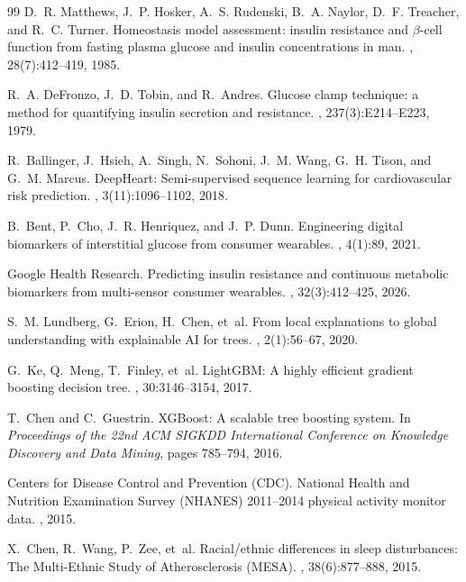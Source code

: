 \documentclass[12pt,a4paper,oneside]{report}
\begin{document}
\begin{thebibliography}{99}
D.~R. Matthews, J.~P. Hosker, A.~S. Rudenski, B.~A. Naylor, D.~F. Treacher, and R.~C. Turner.
\newblock Homeostasis model assessment: insulin resistance and $\beta$-cell function from fasting plasma glucose and insulin concentrations in man.
, 28(7):412--419, 1985.

R.~A. DeFronzo, J.~D. Tobin, and R.~Andres.
\newblock Glucose clamp technique: a method for quantifying insulin secretion and resistance.
, 237(3):E214--E223, 1979.

R.~Ballinger, J.~Hsieh, A.~Singh, N.~Sohoni, J.~M. Wang, G.~H. Tison, and G.~M. Marcus.
\newblock DeepHeart: Semi-supervised sequence learning for cardiovascular risk prediction.
, 3(11):1096--1102, 2018.

B.~Bent, P.~Cho, J.~R. Henriquez, and J.~P. Dunn.
\newblock Engineering digital biomarkers of interstitial glucose from consumer wearables.
, 4(1):89, 2021.

Google Health Research.
\newblock Predicting insulin resistance and continuous metabolic biomarkers from multi-sensor consumer wearables.
, 32(3):412--425, 2026.

S.~M. Lundberg, G.~Erion, H.~Chen, et~al.
\newblock From local explanations to global understanding with explainable AI for trees.
, 2(1):56--67, 2020.

G.~Ke, Q.~Meng, T.~Finley, et~al.
\newblock LightGBM: A highly efficient gradient boosting decision tree.
, 30:3146--3154, 2017.

T.~Chen and C.~Guestrin.
\newblock XGBoost: A scalable tree boosting system.
\newblock In {\em Proceedings of the 22nd ACM SIGKDD International Conference on Knowledge Discovery and Data Mining}, pages 785--794, 2016.

Centers for Disease Control and Prevention (CDC).
\newblock National Health and Nutrition Examination Survey (NHANES) 2011--2014 physical activity monitor data.
, 2015.

X.~Chen, R.~Wang, P.~Zee, et~al.
\newblock Racial/ethnic differences in sleep disturbances: The Multi-Ethnic Study of Atherosclerosis (MESA).
, 38(6):877--888, 2015.
\end{thebibliography}
\end{document}
